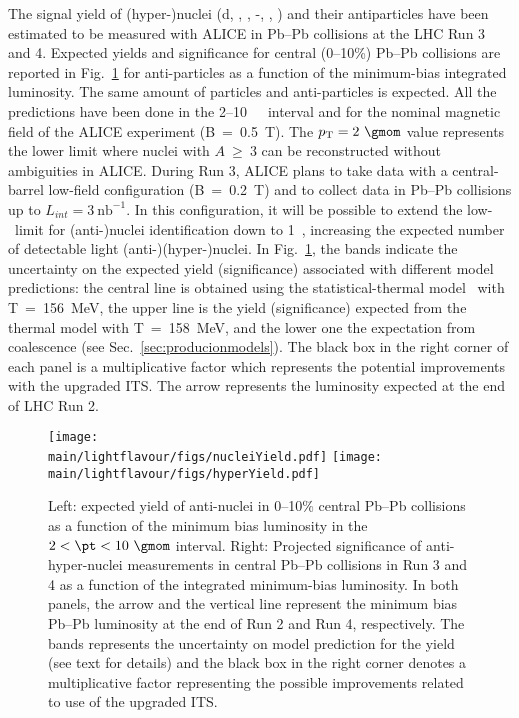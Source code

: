 The signal yield of (hyper-)nuclei (d,  \hethree, \hefour, \hyp, \hypfour, \hyphefour) and their antiparticles have been estimated to be measured with ALICE in Pb--Pb collisions at the LHC Run 3 and 4. 
Expected yields and significance for central (0--10\%) Pb--Pb collisions are reported in Fig.~\ref{fig:yieldrun34} for anti-particles as a function of the minimum-bias integrated luminosity. The same amount of particles and anti-particles is expected. 
All the predictions have been done in the 2--10~\gmom\ \pT\ interval and for the nominal magnetic field of the ALICE experiment (B~=~0.5~T). The $\pT = 2~\gmom$ value represents the lower limit where nuclei with $A~\geq~3$ can be reconstructed without ambiguities in ALICE. 
During Run 3, ALICE plans to take data with a central-barrel low-field configuration (B~=~0.2~T) and to collect data in Pb--Pb collisions up to $L_{int} = 3~\mathrm{nb}^{-1}$. 
In this configuration, it will be possible to extend the low-\pT\ limit for (anti-)nuclei identification down to 1~\gmom, increasing the expected number of detectable light (anti-)(hyper-)nuclei. 
In Fig.~\ref{fig:yieldrun34}, the bands indicate the uncertainty on the expected yield 
(significance) associated with different model predictions:
the central line is obtained using the statistical-thermal model~\cite{Andronic:2010qu} with T~=~156~MeV, the upper line is the yield (significance) expected from the thermal model with T~=~158~MeV,  and the lower one the expectation from coalescence (see Sec.~\ref{sec:producionmodels}). 
The black box in the right corner of each panel is a multiplicative factor which represents the potential improvements with the upgraded ITS.  The arrow represents the luminosity expected at the end of LHC Run 2. 

\begin{figure}%
\begin{center}
\texttt{[image: \\main/lightflavour/figs/nucleiYield.pdf]}
\texttt{[image: \\main/lightflavour/figs/hyperYield.pdf]}
\end{center}
\caption{Left: expected yield of anti-nuclei in 0--10$\%$ central Pb--Pb collisions as a function of the minimum bias luminosity in the $2<\pt<10~\gmom$ interval. 
Right: Projected significance of anti-hyper-nuclei measurements in central Pb--Pb collisions in Run 3 and 4 as a function of the integrated minimum-bias luminosity. 
In both panels, the arrow and the vertical line represent the minimum bias Pb--Pb luminosity at the end of Run 2 and Run 4, respectively. The bands represents the uncertainty on model prediction for the yield (see text for details) and the black box in the right corner denotes a multiplicative factor representing the possible improvements related to use of the upgraded ITS.}
\label{fig:yieldrun34}
\end{figure}

